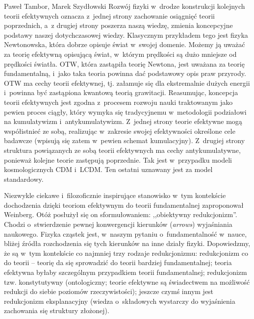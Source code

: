 \begin{artplenv2auth}{Paweł Tambor, Marek Szydłowski}
Rozwój fizyki w~drodze konstrukcji kolejnych teorii efektywnych oznacza z~jednej strony zachowanie osiągnięć teorii poprzednich, a~z drugiej strony poszerza naszą wiedzę, zmienia koncepcyjne podstawy naszej dotychczasowej wiedzy. Klasycznym przykładem tego jest fizyka Newtonowska, która dobrze opisuje świat w~swojej domenie. Możemy ją uważać za teorię efektywną opisującą świat, w~którym prędkości są dużo mniejsze od prędkości światła. OTW, która zastąpiła teorię Newtona, jest uważana za teorię fundamentalną, i~jako taka teoria powinna dać podstawowy opis praw przyrody. OTW ma cechy teorii efektywnej, tj. załamuje się dla ekstremalnie dużych energii i~powinna być zastąpiona kwantową teorią grawitacji. Reasumując, koncepcja teorii efektywnych jest zgodna z~procesem rozwoju nauki traktowanym jako pewien proces ciągły, który wymyka się tradycyjnemu w~metodologii podziałowi na kumulatywizm i~antykumulatywizm. Z~jednej strony teorie efektywne mogą współistnieć ze sobą, realizując w~zakresie swojej efektywności określone cele badawcze (wpisują się zatem w~pewien schemat kumulacyjny). Z~drugiej strony struktura powiązanych ze sobą teorii efektywnych ma cechy antykumulatywne, ponieważ kolejne teorie zastępują poprzednie. Tak jest w~przypadku modeli kosmologicznych CDM i~LCDM. Ten ostatni uznawany jest za model standardowy.

Niezwykle ciekawe i~filozoficznie inspirujące stanowisko w~tym kontekście dochodzenia dzięki teoriom efektywnym do teorii fundamentalnej zaproponował Weinberg. Otóż posłużył się on sformułowaniem: ,,obiektywny redukcjonizm''. Chodzi o~stwierdzenie pewnej konwergencji kierunków (\textit{arrows}) wyjaśniania naukowego. Fizyka cząstek jest, w~naszym pytaniu o~fundamentalność w~nauce, bliżej źródła rozchodzenia się tych kierunków na inne działy fizyki. Dopowiedzmy, że są w~tym kontekście co najmniej trzy rodzaje redukcjonizmu: redukcjonizm co do teorii -- teorię da się sprowadzić do teorii bardziej fundamentalnej; teoria efektywna byłaby szczególnym przypadkiem teorii fundamentalnej; redukcjonizm tzw. konstytutywny (ontologiczny; teorie efektywne są świadectwem na możliwość redukcji do siebie poziomów rzeczywistości); jeszcze czymś innym jest redukcjonizm eksplanacyjny (wiedza o~składowych wystarczy do wyjaśnienia zachowania się struktury złożonej).


\end{artplenv2auth}
